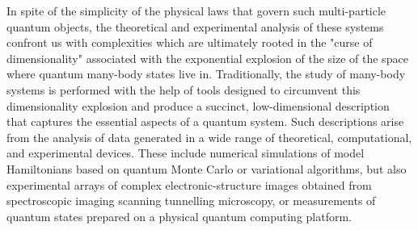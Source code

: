 \documentclass[twocolumn,english,reprint,superscriptaddress,longbibliography,pra]{revtex4-1}
\begin{document}
In spite of the simplicity of the physical laws that govern such multi-particle quantum objects, the theoretical and experimental analysis of these systems confront us with complexities which are ultimately rooted in the "curse of dimensionality" associated with the exponential explosion of the size of the space where quantum many-body states live in. Traditionally, the study of many-body systems is performed with the help of tools designed to circumvent this dimensionality explosion and produce a succinct, low-dimensional description that captures the essential aspects of a quantum system. Such descriptions arise from the analysis of data generated in a wide range of theoretical, computational, and experimental devices. These include numerical simulations of model Hamiltonians based on quantum Monte Carlo or variational algorithms, but also experimental arrays of complex electronic-structure images obtained from spectroscopic imaging scanning tunnelling microscopy, or measurements of quantum states prepared on a physical quantum computing platform.
\end{document}
